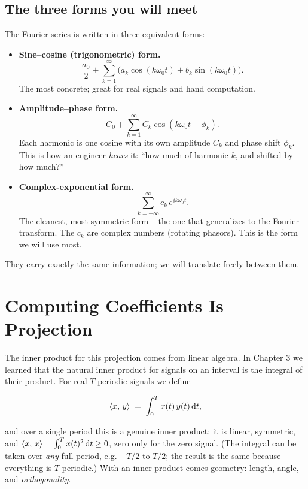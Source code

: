 \subsection{The three forms you will meet}

The Fourier series is written in three equivalent forms:

\begin{itemize}
\item \textbf{Sine--cosine (trigonometric) form.}
\[
\frac{a_0}{2} + \sum_{k=1}^{\infty}\bigl(a_k\cos(k\omega_0 t) + b_k\sin(k\omega_0 t)\bigr).
\]
The most concrete; great for real signals and hand computation.
\item \textbf{Amplitude--phase form.}
\[
C_0 + \sum_{k=1}^{\infty} C_k\cos(k\omega_0 t - \phi_k).
\]
Each harmonic is one cosine with its
own amplitude \(C_k\) and phase shift \(\phi_k\). This is how an engineer \emph{hears} it:
``how much of harmonic \(k\), and shifted by how much?''
\item \textbf{Complex-exponential form.}
\[
\sum_{k=-\infty}^{\infty} c_k\, e^{\jj k\omega_0 t}.
\]
The cleanest, most symmetric form -- the one that generalizes to the
Fourier transform. The \(c_k\) are complex numbers (rotating phasors). This is the form
we will use most.
\end{itemize}

They carry exactly the same information; we will translate freely between them.

\section{Computing Coefficients Is Projection}

The inner product for this projection comes from linear algebra.
In Chapter 3 we learned that the natural inner product for signals on an interval is the
integral of their product. For real $T$-periodic signals we define

\begin{equation}
\langle x,\, y \rangle \;=\; \int_{0}^{T} x(t)\,y(t)\,\mathrm{d} t,
\label{ch06:inner}
\end{equation}

and over a single period this is a genuine inner product: it is linear, symmetric, and
\(\langle x,\, x \rangle = \int_0^T x(t)^2\,\mathrm{d} t \ge 0\), zero only for the zero signal. (The
integral can be taken over \emph{any} full period, e.g. \(-T/2\) to \(T/2\); the result is
the same because everything is $T$-periodic.) With an inner product comes geometry:
length, angle, and \emph{orthogonality}.

